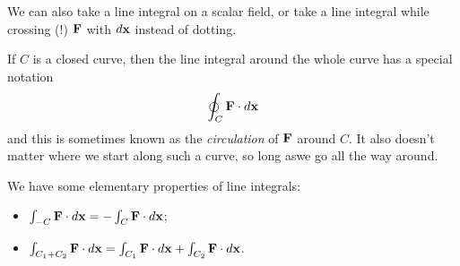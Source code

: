 \documentclass{../../template/note}
\begin{document}
    \begin{remark*}
        We can also take a line integral on a scalar field, or take a line integral while crossing (!) \(\V F\) with \(d \V x\) instead of dotting.
    \end{remark*}
    
    If \(C\) is a closed curve, then the line integral around the whole curve has a special notation
    \begin{align*}
        \oint_C \V F \cdot d \V x
    \end{align*}
    and this is sometimes known as the \emph{circulation} of \(\V F\) around \(C\). It also doesn't matter where we start along such a curve, so long aswe go all the way around.

    We have some elementary properties of line integrals:
    \begin{itemize}
        \item \(\int_{-C} \V F \cdot d \V x = -\int_C \V F \cdot d \V x\);
        \item \(\int_{C_1+C_2} \V F \cdot d \V x = \int_{C_1} \V F \cdot d \V x + \int_{C_2} \V F \cdot d \V x\).
    \end{itemize}
    
\end{document}
